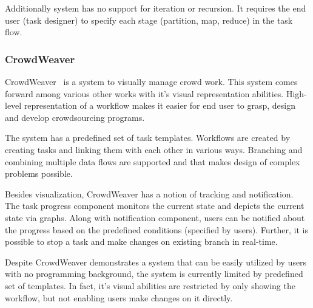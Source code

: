 Additionally system has no support for iteration or recursion. It requires the 
end user (task designer) to specify each stage (partition, map, reduce) in the task flow.


\subsubsection{CrowdWeaver}
CrowdWeaver~\cite{Kittur2012} is a system to visually manage crowd work. 
This system comes forward among various other works with it's visual representation 
abilities. High-level representation of a workflow makes it easier for end user to grasp, 
design and develop crowdsourcing programs.

The system has a predefined set of task templates. Workflows are created by 
creating tasks and linking them with each other in various ways. Branching and 
combining multiple data flows are supported and that makes design of complex 
problems possible. 

Besides visualization, CrowdWeaver has a notion of tracking and notification. 
The task progress component monitors the current state and depicts the current state
via graphs. Along with notification component, users can be notified about the 
progress based on the predefined conditions (specified by users). Further, 
it is possible to stop a task and make changes on existing branch in real-time. 

Despite CrowdWeaver demonstrates a system that can be easily utilized by users 
with no programming background, the system is currently limited by predefined set 
of templates. In fact, it's visual abilities are restricted by only showing the workflow, 
but not enabling users make changes on it directly.



